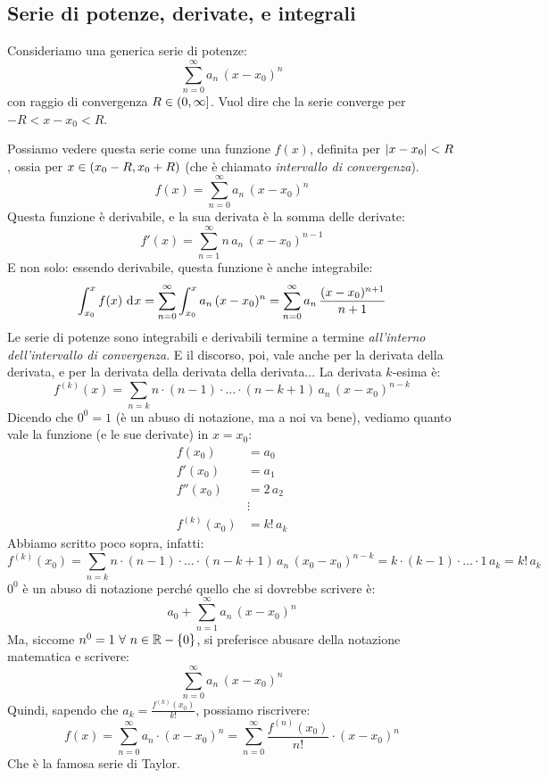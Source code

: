 \subsection{Serie di potenze, derivate, e integrali}

Consideriamo una generica serie di potenze:
\[
\sum_{n = 0}^{\infty} a_n \, (x - x_0)^n
\]
con raggio di convergenza $R \in \left( {0}, {\infty} \right]$. Vuol dire che la serie converge per $- R < x - x_0 < R$.

Possiamo vedere questa serie come una funzione $f(x)$, definita per $\left\lvert{x - x_0}\right\rvert < R$, ossia per $x \in \left( {x_0 - R}, {x_0 + R} \right)$ (che \`e chiamato \emph{intervallo di convergenza}). 
\[
f(x) = \sum_{n = 0}^{\infty} a_n \, (x - x_0)^n
\]
Questa funzione \`e derivabile, e la sua derivata \`e la somma delle derivate:
\[
f'(x) = \sum_{n = 1}^{\infty} n \, a_{n} \, (x - x_0)^{n - 1}
\]
E non solo: essendo derivabile, questa funzione \`e anche integrabile:
\[
\int_{x_0}^{x} f(x) \dx = 
\sum_{n = 0}^{\infty} \int_{x_0}^{x} a_n \, (x - x_0)^n =
\sum_{n = 0}^{\infty} a_n \, \frac{(x - x_0)^{n + 1}}{n + 1}
\]
Le serie di potenze sono integrabili e derivabili termine a termine \emph{all'interno dell'intervallo di convergenza}. E il discorso, poi, vale anche per la derivata della derivata, e per la derivata della derivata della derivata... La derivata $k$-esima \`e:
\[
f^{(k)} (x) = \sum_{n = k} n \cdot (n - 1) \cdot \ldots \cdot (n - k + 1) \, a_n \, (x - x_0)^{n - k}
\]
Dicendo che $0^0 = 1$ (\`e un abuso di notazione, ma a noi va bene), vediamo quanto vale la funzione (e le sue derivate) in $x = x_0$:
\begin{align*}
f(x_0) &= a_0 \\
f'(x_0) &= a_1 \\
f''(x_0) &= 2 \, a_2 \\
&\vdots \\
f^{(k)}(x_0) &= k! \, a_k
\end{align*}
Abbiamo scritto poco sopra, infatti:
\[
f^{(k)} (x_0) = \sum_{n = k} n \cdot (n - 1) \cdot \ldots \cdot (n - k + 1) \, a_n \, (x_0 - x_0)^{n - k} =
k \cdot (k - 1) \cdot \ldots \cdot 1 \, a_{k} = k! \, a_{k}
\]
$0^0$ \`e un abuso di notazione perch\'e quello che si dovrebbe scrivere \`e:
\[
a_0 + \sum_{n = 1}^{\infty} a_n \, (x - x_0)^n
\]
Ma, siccome $n^0 = 1 \forall n \in \reals - \{ 0 \}$, si preferisce abusare della notazione matematica e scrivere:
\[
\sum_{n = 0}^{\infty} a_n \, (x - x_0)^n
\]
Quindi, sapendo che $a_k = \frac{f^{(k)}(x_0)}{k!}$, possiamo riscrivere:
\[
f(x) = \sum_{n = 0}^{\infty} a_n \cdot (x - x_0)^n =
\sum_{n = 0}^{\infty} \frac{f^{(n)} (x_0)}{n!} \cdot (x - x_0)^{n}
\]
Che \`e la famosa serie di Taylor.

